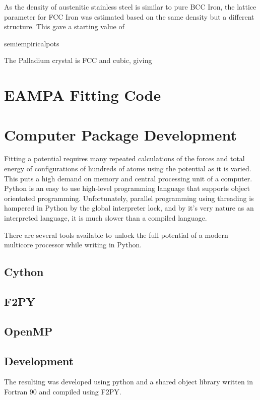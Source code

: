 As the density of austenitic stainless steel is similar to pure BCC Iron, the lattice parameter for FCC Iron was estimated based on the same density but a different structure.  This gave a starting value of 

semiempiricalpots





The Palladium crystal is FCC and cubic, giving




\section{EAMPA Fitting Code}

\section{Computer Package Development}
 
Fitting a potential requires many repeated calculations of the forces and total energy of configurations of hundreds of atoms using the potential as it is varied.  This puts a high demand on memory and central processing unit of a computer.  Python is an easy to use high-level programming language that supports object orientated programming.  Unfortunately, parallel programming using threading is hampered in Python by the global interpreter lock, and by it's very nature as an interpreted language, it is much slower than a compiled language.

There are several tools available to unlock the full potential of a modern multicore processor while writing in Python.

\subsection{Cython}



\subsection{F2PY}




\subsection{OpenMP}



\subsection{Development}

The resulting was developed using python and a shared object library written in Fortran 90 and compiled using F2PY.














